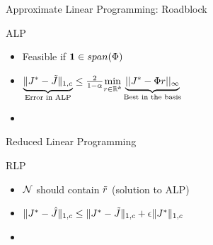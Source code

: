 \documentclass[10pt]{beamer}
\begin{document}
\begin{frame}[fragile]{Approximate Linear Programming: Roadblock}
\begin{algorithm}[H]
\caption*{ALP\cite{schweitzer1985generalized,de2003linear}}
\begin{algorithmic}[1]

\STATE{\}}
\end{algorithmic}
\end{algorithm}
\p
\begin{itemize}
\item Feasible if $\mathbf{1} \in span(\Phi)$\p
\item $\underbrace{\|J^*-\tilde{J}\|_{1,c}}_{\text{Error in ALP}}\leq \frac{2}{1-\alpha}\underset{r\in \mathbb{R}^k}{\min}\underbrace{||J^*-\Phi r||_{\infty}}_{\text{Best in the basis}}$\p
\item {\color{orange}{Limited theory for Constraint Reduction}}
\end{itemize}

\end{frame}
\begin{frame}[fragile] {Reduced Linear Programming}
\begin{algorithm}[H]
\caption*{RLP\cite{de2004constraint}}
\begin{algorithmic}[1]
\STATE{\}}
\end{algorithmic}
\end{algorithm}
\p
\begin{itemize}
\item $\mathcal{N}$ should contain $\tilde{r}$ (solution to ALP)\p
\item $\|J^*-\hat{J}\|_{1,c}\leq \|J^*-\tilde{J}\|_{1,c}+\epsilon\|J^*\|_{1,c}$
\item {\color{orange}{$\I$ needs to selected using $u^*$}}
\end{itemize}
\end{frame}
\end{document}
